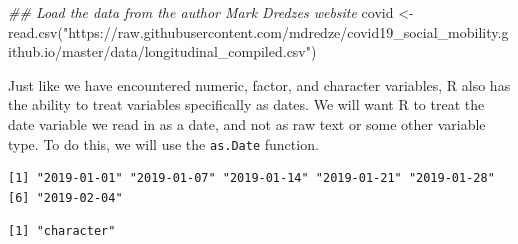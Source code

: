 \documentclass[
  letterpaper,
  DIV=11,
  numbers=noendperiod]{scrreprt}
\newenvironment{Shaded}{\begin{snugshade}}{\end{snugshade}}
\newcommand{\DocumentationTok}[1]{\textcolor[rgb]{0.37,0.37,0.37}{\textit{#1}}}
\newcommand{\FunctionTok}[1]{\textcolor[rgb]{0.28,0.35,0.67}{#1}}
\newcommand{\NormalTok}[1]{\textcolor[rgb]{0.00,0.23,0.31}{#1}}
\newcommand{\OtherTok}[1]{\textcolor[rgb]{0.00,0.23,0.31}{#1}}
\newcommand{\SpecialCharTok}[1]{\textcolor[rgb]{0.37,0.37,0.37}{#1}}
\newcommand{\StringTok}[1]{\textcolor[rgb]{0.13,0.47,0.30}{#1}}
\begin{document}
\begin{Shaded}
\begin{Highlighting}[]
\DocumentationTok{\#\# Load the data from the author Mark Dredze\textquotesingle{}s website}
\NormalTok{covid }\OtherTok{\textless{}{-}} \FunctionTok{read.csv}\NormalTok{(}\StringTok{"https://raw.githubusercontent.com/mdredze/covid19\_social\_mobility.github.io/master/data/longitudinal\_compiled.csv"}\NormalTok{)}
\end{Highlighting}
\end{Shaded}

Just like we have encountered numeric, factor, and character variables,
R also has the ability to treat variables specifically as dates. We will
want R to treat the date variable we read in as a date, and not as raw
text or some other variable type. To do this, we will use the
\texttt{as.Date} function.

\begin{Shaded}
\end{Shaded}

\begin{verbatim}
[1] "2019-01-01" "2019-01-07" "2019-01-14" "2019-01-21" "2019-01-28"
[6] "2019-02-04"
\end{verbatim}

\begin{Shaded}
\end{Shaded}

\begin{verbatim}
[1] "character"
\end{verbatim}

\begin{Shaded}
\end{Shaded}
\end{document}
